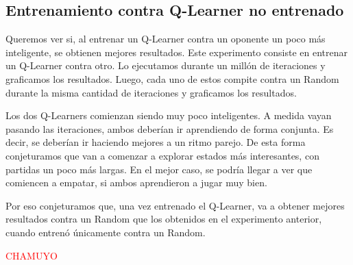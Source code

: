 \subsection{Entrenamiento contra Q-Learner no entrenado}

Queremos ver si, al entrenar un Q-Learner contra un oponente un poco más inteligente, se obtienen mejores resultados. Este experimento consiste en entrenar un Q-Learner contra otro. Lo ejecutamos durante un mill\'on de iteraciones y graficamos los resultados. Luego, cada uno de estos compite contra un Random durante la misma cantidad de iteraciones y graficamos los resultados.

Los dos Q-Learners comienzan siendo muy poco inteligentes. A medida vayan pasando las iteraciones, ambos deberían ir aprendiendo de forma conjunta. Es decir, se deberían ir haciendo mejores a un ritmo parejo. De esta forma conjeturamos que van a comenzar a explorar estados más interesantes, con partidas un poco más largas. En el mejor caso, se podría llegar a ver que comiencen a empatar, si ambos aprendieron a jugar muy bien.

Por eso conjeturamos que, una vez entrenado el Q-Learner, va a obtener mejores resultados contra un Random que los obtenidos en el experimento anterior, cuando entrenó únicamente contra un Random.

\textcolor{red}{CHAMUYO}
